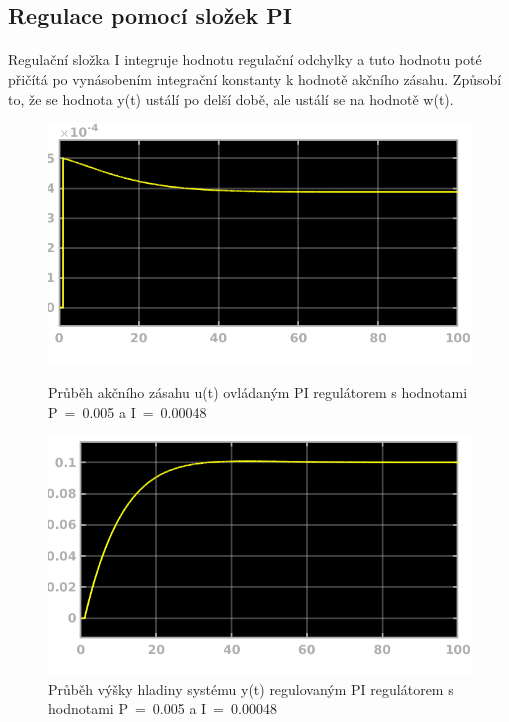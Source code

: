 \documentclass{article}
\begin{document}
	\subsection{Regulace pomocí složek PI}
	\paragraph{}
	
	Regulační složka I integruje hodnotu regulační odchylky a tuto hodnotu poté přičítá po vynásobením integrační konstanty k hodnotě akčního zásahu. Způsobí to, že se hodnota y(t) ustálí po delší době, ale ustálí se na hodnotě w(t). 
	
	
	\begin{figure}[H]
	   		 \begin{minipage}[b]{.45\textwidth}
    \centering
    \includegraphics[width=\linewidth]{ukol3P0005I000048U}
    \caption{Průběh akčního zásahu u(t) ovládaným PI regulátorem s hodnotami P~=~0.005 a I~=~0.00048}
  \end{minipage}\hfill
  \begin{minipage}[b]{.45\textwidth}
    \centering
    \includegraphics[width=\linewidth]{ukol3P0005I000048Y}
    \caption{Průběh výšky hladiny systému y(t) regulovaným PI regulátorem s hodnotami P~=~0.005 a I~=~0.00048}
    \label{img:hladinaPI0005}
  \end{minipage}
	   		\end{figure}
	   		
\end{document}
